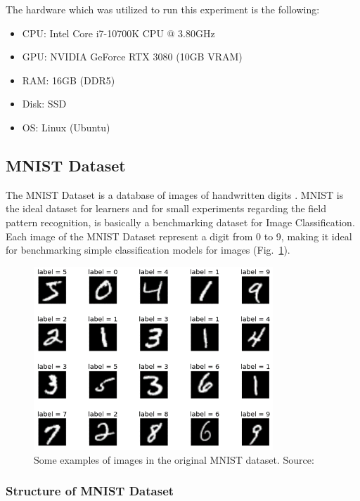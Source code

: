 The hardware which was utilized to run this experiment is the following:
\begin{itemize}[itemsep=0.1cm]
	\item CPU: Intel Core i7-10700K CPU @ 3.80GHz
	\item GPU: NVIDIA GeForce RTX 3080 (10GB VRAM)
	\item RAM: 16GB (DDR5)
	\item Disk: SSD
	\item OS: Linux (Ubuntu)
\end{itemize}

\subsection{MNIST Dataset}

The MNIST Dataset is a database of images of handwritten digits \cite{MNIST}.
MNIST is the ideal dataset for learners and for small experiments regarding the field pattern recognition, is basically a benchmarking dataset for Image Classification.
\\[0.3cm]Each image of the MNIST Dataset represent a digit from 0 to 9, making it ideal for benchmarking simple classification models for images (Fig.~\ref{fig:figure-4.1.3}).
\begin{figure}[t]
	\centering
	\includegraphics[width=9cm]{figures/figure-4.1.3.png}
	\caption[Examples of MNIST Images]{Some examples of images in the original MNIST dataset. Source:~\cite{MNIST}}
	\label{fig:figure-4.1.3}
\end{figure}

\subsubsection{Structure of MNIST Dataset}

